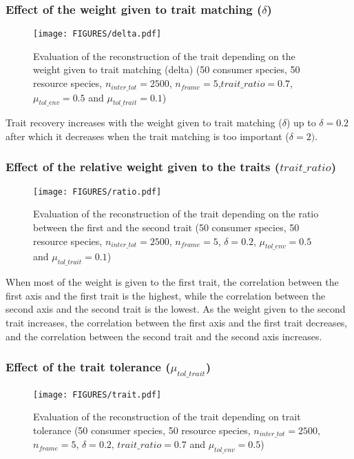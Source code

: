 \subsubsection{Effect of the weight given to trait matching ($\delta$)}

\begin{figure}[H]
    \centering
    \texttt{[image: FIGURES/delta.pdf]}
    \caption{Evaluation of the reconstruction of the trait depending on the weight given to trait matching (delta) (50 consumer species, 50 resource species, $n_{inter\_tot} = 2500$, $n_{frame} = 5$,$trait\_ratio = 0.7$, $\mu_{tol\_env} = 0.5$ and $\mu_{tol\_trait} = 0.1$)}
    \label{fig:delta}
\end{figure}

Trait recovery increases with the weight given to trait matching ($\delta$) up to $\delta = 0.2$ after which it decreases when the trait matching is too important ($\delta = 2).$



\subsubsection{Effect of the relative weight given to the traits ($trait\_ratio$)}

\begin{figure}[H]
    \centering
    \texttt{[image: FIGURES/ratio.pdf]}
    \caption{Evaluation of the reconstruction of the trait depending on the ratio between the first and the second trait (50 consumer species, 50 resource species, $n_{inter\_tot} = 2500$, $n_{frame} = 5$, $\delta =  0.2$, $\mu_{tol\_env} = 0.5$ and $\mu_{tol\_trait} = 0.1$)}
    \label{fig:trait_ratio}
\end{figure}

When most of the weight is given to the first trait, the correlation between the first axis and the first trait is the highest, while the correlation between the second axis and the second trait is the lowest. As the weight given to the second trait increases, the correlation between the first axis and the first trait decreases, and the correlation between the second trait and the second axis increases.


\subsubsection{Effect of the trait tolerance ($\mu_{tol\_trait}$)}

\begin{figure}[H]
    \centering
    \texttt{[image: FIGURES/trait.pdf]}
    \caption{Evaluation of the reconstruction of the trait depending on trait tolerance (50 consumer species, 50 resource species, $n_{inter\_tot} = 2500$, $n_{frame} = 5$, $\delta =  0.2$, $trait\_ratio = 0.7$ and $\mu_{tol\_env} = 0.5$)}
    \label{fig:tol_trait}
\end{figure}

